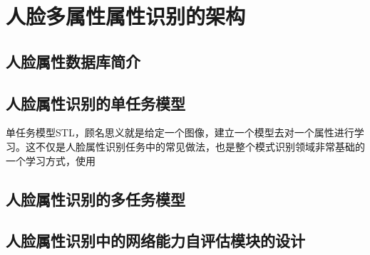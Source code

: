 \chapter{人脸多属性属性识别的架构}
\section{人脸属性数据库简介}
\section{人脸属性识别的单任务模型}
单任务模型STL，顾名思义就是给定一个图像，建立一个模型去对一个属性进行学习。这不仅是人脸属性识别任务中的常见做法，也是整个模式识别领域非常基础的一个学习方式，使用




\section{人脸属性识别的多任务模型}
\section{人脸属性识别中的网络能力自评估模块的设计}

